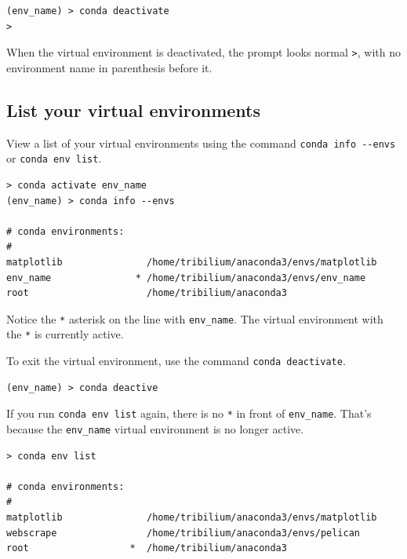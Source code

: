 \documentclass{book}
\begin{document}
\begin{lstlisting}
(env_name) > conda deactivate
>
\end{lstlisting}

When the virtual environment is deactivated, the prompt looks normal
\lstinline!>!, with no environment name in parenthesis before it.
    




    
        \subsection{List your virtual
environments}\label{list-your-virtual-environments}

View a list of your virtual environments using the command
\lstinline!conda info --envs! or \lstinline!conda env list!.

\begin{lstlisting}
> conda activate env_name
(env_name) > conda info --envs

# conda environments:
#
matplotlib               /home/tribilium/anaconda3/envs/matplotlib
env_name               * /home/tribilium/anaconda3/envs/env_name
root                     /home/tribilium/anaconda3
\end{lstlisting}

Notice the \lstinline!*! asterisk on the line with \lstinline!env_name!.
The virtual environment with the \lstinline!*! is currently active.

To exit the virtual environment, use the command
\lstinline!conda deactivate!.

\begin{lstlisting}
(env_name) > conda deactive
\end{lstlisting}

If you run \lstinline!conda env list! again, there is no \lstinline!*!
in front of \lstinline!env_name!. That's because the
\lstinline!env_name! virtual environment is no longer active.

\begin{lstlisting}
> conda env list

# conda environments:
#
matplotlib               /home/tribilium/anaconda3/envs/matplotlib
webscrape                /home/tribilium/anaconda3/envs/pelican
root                  *  /home/tribilium/anaconda3
\end{lstlisting}
    




    
\end{document}
